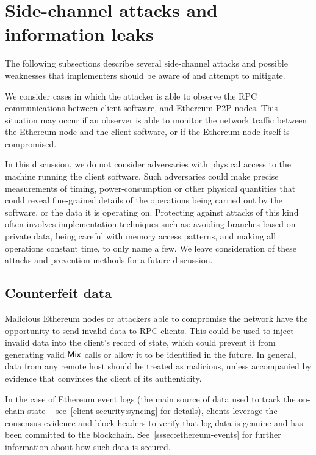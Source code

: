 
\chapter{Side-channel attacks and information leaks}\label{appendix:sca-attacks}

The following subsections describe several side-channel attacks and possible weaknesses that implementers should be aware of and attempt to mitigate.

We consider cases in which the attacker is able to observe the RPC communications between \zeth{} client software, and Ethereum P2P nodes. This situation may occur if an observer is able to monitor the network traffic between the Ethereum node and the \zeth{} client software, or if the Ethereum node itself is compromised.

\begin{notebox}
In this discussion, we do not consider adversaries with physical access to the machine running the client software. Such adversaries could make precise measurements of timing, power-consumption or other physical quantities that could reveal fine-grained details of the operations being carried out by the software, or the data it is operating on. Protecting against attacks of this kind often involves implementation techniques such as: avoiding branches based on private data, being careful with memory access patterns, and making all operations constant time, to only name a few. We leave consideration of these attacks and prevention methods for a future discussion.
\end{notebox}

\section{Counterfeit data}\label{appendix:sca-attacks:counterfeit-data}

Malicious Ethereum nodes or attackers able to compromise the network have the opportunity to send invalid data to RPC clients. This could be used to inject invalid data into the client's record of state, which could prevent it from generating valid $\mathsf{Mix}$ calls or allow it to be identified in the future. In general, data from any remote host should be treated as malicious, unless accompanied by evidence that convinces the client of its authenticity.

In the case of Ethereum event logs (the main source of data used to track the on-chain state -- see~\cref{client-security:syncing} for details), clients \MUST{} leverage the consensus evidence and block headers to verify that log data is genuine and has been committed to the blockchain. See~\cref{sssec:ethereum-events} for further information about how such data is secured.

